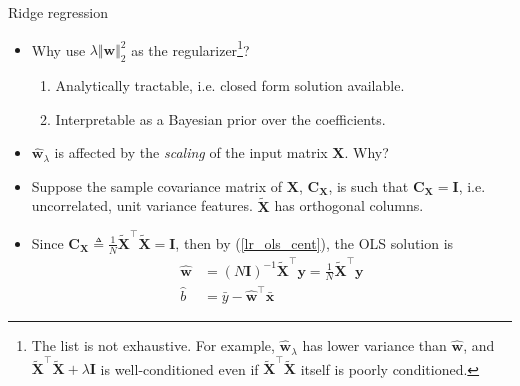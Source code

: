 \documentclass{beamer}
\numberwithin{equation}{section}
\newcommand{\aref}[1]{\alert{\ref{#1}}}
\begin{document}
\begin{frame}{Ridge regression}
    \begin{itemize}
        \item
        Why use $ \lambda\Vert\mathbf{w}\Vert_2^2 $ as the
        regularizer\footnote{
            The list is not exhaustive. For example,
            $ \hat{\mathbf{w}}_\lambda $ has lower variance than
            $ \hat{\mathbf{w}} $, and
            $ \tilde{\mathbf{X}}^\top\tilde{\mathbf{X}} +
            \lambda\mathbf{I} $ is well-conditioned even if
            $ \tilde{\mathbf{X}}^\top\tilde{\mathbf{X}} $ itself is poorly
            conditioned.
        }?
        \begin{enumerate}
            \item
            Analytically tractable, i.e. closed form solution available.

            \item
            Interpretable as a Bayesian prior over the coefficients.
        \end{enumerate}

        \item
        \alert{
            $ \hat{\mathbf{w}}_\lambda $ is affected by the
            \textit{scaling} of the input matrix $ \mathbf{X} $. Why?
        }

        \item
        Suppose the sample covariance matrix of $ \mathbf{X} $,
        $ \mathbf{C}_\mathbf{X} $, is such that
        $ \mathbf{C}_\mathbf{X} = \mathbf{I} $, i.e. uncorrelated, unit
        variance features. $ \tilde{\mathbf{X}} $ has orthogonal columns.

        \item
        Since $ \mathbf{C}_\mathbf{X} \triangleq
        \frac{1}{N}\tilde{\mathbf{X}}^\top\tilde{\mathbf{X}} = \mathbf{I} $,
        then by (\aref{lr_ols_cent}), the OLS solution is
        \begin{equation} \label{lr_ols_ortho}
            \begin{split}
	            \hat{\mathbf{w}} & = (N\mathbf{I})^{-1}\tilde{\mathbf{X}}^\top
	            \mathbf{y} = \frac{1}{N}\tilde{\mathbf{X}}^\top\mathbf{y} \\
	            \hat{b} & = \bar{y} - \hat{\mathbf{w}}^\top\bar{\mathbf{x}}
	        \end{split}
        \end{equation}
    \end{itemize}
\end{frame}
\end{document}
